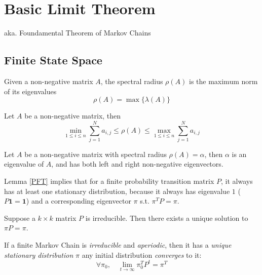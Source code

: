 \section{Basic Limit Theorem}\label{BasicLimitTheorem}
aka. Foundamental Theorem of Markov Chains

\subsection{Finite State Space}
\begin{definition}
    Given a non-negative matrix $A$, the spectral radius $\rho(A)$ is the maximum norm of its eigenvalues
    \[ \rho(A) = \max\{ \lambda(A) \} \]
\end{definition}
\begin{proposition}
    Let $A$ be a non-negative matrix, then
    \[ \min_{1\le i \le n} \sum_{j=1}^N a_{i,j} \le \rho(A) \le \max_{1\le i \le n} \sum_{j=1}^N a_{i,j} \]
\end{proposition}
\begin{lemma}\label{PFT}
    Let $A$ be a non-negative matrix with spectral radius $\rho(A) = \alpha$, then $\alpha$ is an eigenvalue of $A$, and has both left and right non-negative eigenvectors.
\end{lemma}
\begin{remark}
    Lemma \ref{PFT} implies that for a finite probability transition matrix $P$, it always has at least one stationary distribution, because it always has eigenvalue $1$ ($P\mathbf{1} = \mathbf{1}$) and a corresponding eigenvector $\pi$ s.t. $\pi^TP = \pi$.
\end{remark}

\begin{lemma}
    Suppose a $k \times k$ matrix $P$ is irreducible. Then there exists a unique solution to $\pi P = \pi$.
\end{lemma}
\begin{theorem} If a finite Markov Chain is \emph{irreducible} and \emph{aperiodic}, then it has a \emph{unique stationary distribution} $\pi$ any initial distribution \emph{converges} to it:
    \[ \forall \pi_0,\quad \lim_{t\to\infty}\pi_0^T P^t = \pi^T \]
\end{theorem}

